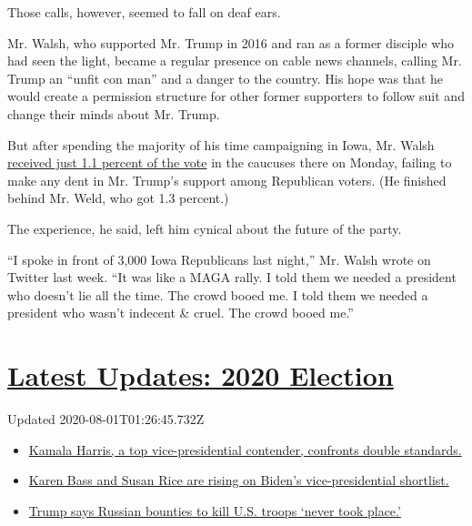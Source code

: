 Those calls, however, seemed to fall on deaf ears.

Mr. Walsh, who supported Mr. Trump in 2016 and ran as a former disciple
who had seen the light, became a regular presence on cable news
channels, calling Mr. Trump an ``unfit con man'' and a danger to the
country. His hope was that he would create a permission structure for
other former supporters to follow suit and change their minds about Mr.
Trump.

But after spending the majority of his time campaigning in Iowa, Mr.
Walsh
\href{https://www.nytimes.com/interactive/2020/02/03/us/elections/results-iowa-caucus-republicans.html}{received
just 1.1 percent of the vote} in the caucuses there on Monday, failing
to make any dent in Mr. Trump's support among Republican voters. (He
finished behind Mr. Weld, who got 1.3 percent.)

The experience, he said, left him cynical about the future of the party.

``I spoke in front of 3,000 Iowa Republicans last night,'' Mr. Walsh
wrote on Twitter last week. ``It was like a MAGA rally. I told them we
needed a president who doesn't lie all the time. The crowd booed me. I
told them we needed a president who wasn't indecent \& cruel. The crowd
booed me.''

\hypertarget{latest-updates-2020-election}{%
\section{\texorpdfstring{\href{https://www.nytimes.com/2020/07/31/us/elections/biden-vs-trump.html?action=click\&pgtype=Article\&state=default\&region=MAIN_CONTENT_1\&context=storylines_live_updates}{Latest
Updates: 2020
Election}}{Latest Updates: 2020 Election}}\label{latest-updates-2020-election}}

Updated 2020-08-01T01:26:45.732Z

\begin{itemize}
\tightlist
\item
  \href{https://www.nytimes.com/2020/07/31/us/elections/biden-vs-trump.html?action=click\&pgtype=Article\&state=default\&region=MAIN_CONTENT_1\&context=storylines_live_updates\#link-29fdff45}{Kamala
  Harris, a top vice-presidential contender, confronts double
  standards.}
\item
  \href{https://www.nytimes.com/2020/07/31/us/elections/biden-vs-trump.html?action=click\&pgtype=Article\&state=default\&region=MAIN_CONTENT_1\&context=storylines_live_updates\#link-13ec3d9c}{Karen
  Bass and Susan Rice are rising on Biden's vice-presidential
  shortlist.}
\item
  \href{https://www.nytimes.com/2020/07/31/us/elections/biden-vs-trump.html?action=click\&pgtype=Article\&state=default\&region=MAIN_CONTENT_1\&context=storylines_live_updates\#link-49e9a016}{Trump
  says Russian bounties to kill U.S. troops `never took place.'}
\end{itemize}

